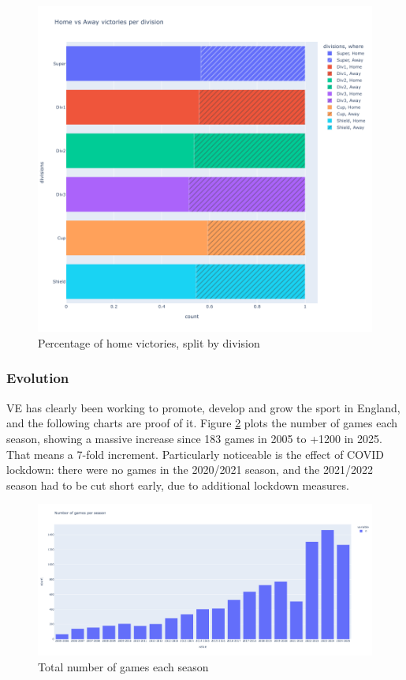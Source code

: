 \begin{figure}
	\centering
	\includegraphics[width=.7\linewidth]{home-victories-per-division.png}
	\caption{Percentage of home victories, split by division}
	\label{fig:home-victories-per-division}
\end{figure}


\subsubsection{Evolution}
\ac{VE} has clearly been working to promote, develop and grow the sport in England, and the following charts are proof of it. Figure \ref{fig:games-per-year} plots the number of games each season, showing a massive increase since 183 games in 2005 to +1200 in 2025. That means a 7-fold increment. Particularly noticeable is the effect of COVID lockdown: there were no games in the 2020/2021 season, and the 2021/2022 season had to be cut short early, due to additional lockdown measures.

\begin{figure}
	\centering
	\includegraphics[width=0.7\linewidth]{games-per-year.png}
	\caption{Total number of games each season}
	\label{fig:games-per-year}
\end{figure}

